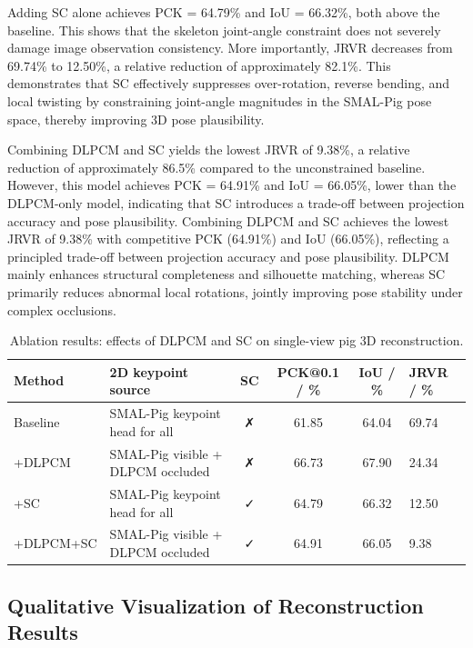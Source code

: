 \documentclass[computers,article,submit,pdftex,moreauthors]{mdpi}
\begin{document}
Adding SC alone achieves PCK = 64.79\% and IoU = 66.32\%, both above the baseline. This shows that the skeleton joint-angle constraint does not severely damage image observation consistency. More importantly, JRVR decreases from 69.74\% to 12.50\%, a relative reduction of approximately 82.1\%. This demonstrates that SC effectively suppresses over-rotation, reverse bending, and local twisting by constraining joint-angle magnitudes in the SMAL-Pig pose space, thereby improving 3D pose plausibility.

Combining DLPCM and SC yields the lowest JRVR of 9.38\%, a relative reduction of approximately 86.5\% compared to the unconstrained baseline. However, this model achieves PCK = 64.91\% and IoU = 66.05\%, lower than the DLPCM-only model, indicating that SC introduces a trade-off between projection accuracy and pose plausibility. Combining DLPCM and SC achieves the lowest JRVR of 9.38\% with competitive PCK (64.91\%) and IoU (66.05\%), reflecting a principled trade-off between projection accuracy and pose plausibility. DLPCM mainly enhances structural completeness and silhouette matching, whereas SC primarily reduces abnormal local rotations, jointly improving pose stability under complex occlusions.

\begin{table}[H]
\caption{Ablation results: effects of DLPCM and SC on single-view pig 3D reconstruction.}
\label{tab:ablation}
\centering
\begin{tabular}{llccc}
\toprule
\textbf{Method} & \textbf{2D keypoint source} & \textbf{SC} & \textbf{PCK@0.1 / \%} & \textbf{IoU / \%} & \textbf{JRVR / \%} \\
\midrule
Baseline & SMAL-Pig keypoint head for all & ✗ & 61.85 & 64.04 & 69.74 \\
+DLPCM & SMAL-Pig visible + DLPCM occluded & ✗ & 66.73 & 67.90 & 24.34 \\
+SC & SMAL-Pig keypoint head for all & ✓ & 64.79 & 66.32 & 12.50 \\
+DLPCM+SC & SMAL-Pig visible + DLPCM occluded & ✓ & 64.91 & 66.05 & 9.38 \\
\bottomrule
\end{tabular}
\end{table}

\subsection{Qualitative Visualization of Reconstruction Results}\label{sec:qualitative}
\end{document}
